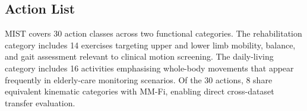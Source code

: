 \documentclass{article}
\begin{document}
\begin{table}[h]
  \centering
  \caption{
    MIST sensor specifications.
    N/A indicates the parameter is not applicable to that modality.
  }
  \label{tab:mist_sensor}
  \small
  \setlength{\tabcolsep}{4pt}
\end{table}

\subsection{Action List}
\label{app:mist_actions}

MIST covers 30 action classes across two functional categories.
The rehabilitation category includes 14 exercises targeting upper and lower limb
mobility, balance, and gait assessment relevant to clinical motion screening.
The daily-living category includes 16 activities emphasising whole-body movements
that appear frequently in elderly-care monitoring scenarios.
Of the 30 actions, 8 share equivalent kinematic categories with MM-Fi, enabling direct cross-dataset transfer evaluation.
\end{document}
